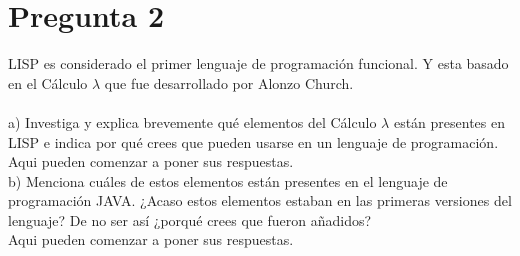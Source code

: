 \newpage
\section*{Pregunta 2}
\Large 
LISP es considerado el primer lenguaje de programación funcional. Y esta basado en el Cálculo $\lambda$ que fue desarrollado por Alonzo Church.\\\\
a) Investiga y explica brevemente qué elementos del Cálculo $\lambda$ están presentes en LISP e indica por qué crees que pueden usarse en un lenguaje de programación.\\
\newline
\large
Aqui pueden comenzar a poner sus respuestas.\\
\newline
\Large
b) Menciona cuáles de estos elementos están presentes en el lenguaje de programación JAVA. ¿Acaso estos elementos estaban en las primeras versiones del lenguaje? De no ser así ¿porqué crees que fueron añadidos?\\
\newline
\large
Aqui pueden comenzar a poner sus respuestas.
